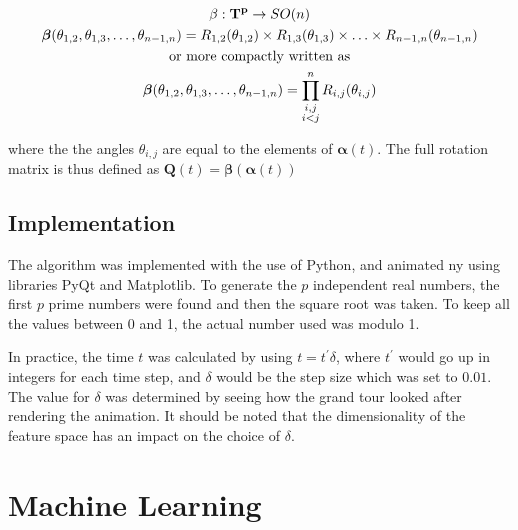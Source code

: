 \documentclass[a4paper,11pt,twoside]{article}
\begin{document}
\begin{equation}
\begin{gathered}
\beta: {\bf T^p}
 \rightarrow SO(n)
\\
\bm{\beta}(\theta_{1,2},\theta_{1,3},\dotsc,\theta_{n-1,n})= R_{1,2}(\theta_{1,2}) \times R_{1,3}(\theta_{1,3}) \times \dotsc \times R_{n-1,n}(\theta_{n-1,n})
\\
\text{or more compactly written as}
\\
\bm{\beta}(\theta_{1,2},\theta_{1,3},\dotsc,\theta_{n-1,n})=\prod_{\substack{i,j \\ i<j}}^nR_{i,j}(\theta_{i,j})
\end{gathered}
\end{equation}

where the the angles $\theta_{i,j}$ are equal to the elements of $\bm{\alpha}(t)$. The full rotation matrix is thus defined as $\bm{Q}(t)=\bm{\beta}(\bm{\alpha}(t))$

\subsection{Implementation}

The algorithm was implemented with the use of Python, and animated ny using libraries PyQt and Matplotlib. To generate the $p$ independent real numbers, the first $p$ prime numbers were found and then the square root was taken. To keep all the values between 0 and 1, the actual number used was  modulo 1. 
\newline

In practice, the time $t$ was calculated by using $t=t^\prime \delta$, where $t^\prime$ would go up in integers for each time step, and $\delta$ would be the step size which was set to $0.01$. The value for $\delta$ was determined by seeing how the grand tour looked after rendering the animation. It should be noted that the dimensionality of the feature space has an impact on the choice of $\delta$.

\newpage
\section{Machine Learning}
\end{document}
